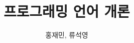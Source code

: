 \documentclass[
  b5paper, %
  fontsize=10pt, %
  twoside=true, %
  numbers=noenddot, %
]{kaobook}
\begin{document}


\title{프로그래밍 언어 개론}

\author{홍재민, 류석영}

\date{}



\frontmatter %




\makeatletter
\uppertitleback{\@titlehead} %

\end{document}
